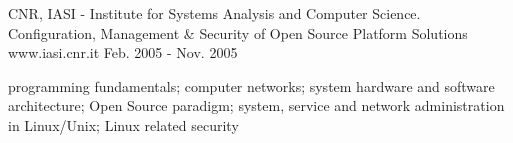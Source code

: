 \begin{cventries}
	\cventry
	{CNR, IASI - Institute for Systems Analysis and Computer Science.} %
	{Configuration, Management \& Security of Open Source Platform Solutions	} %
	{www.iasi.cnr.it} %
	{Feb. 2005 - Nov. 2005} %
	{ %
		\begin{cvitems}
			\item {programming fundamentals; computer networks; system hardware and software architecture; Open Source paradigm; system, service and network administration in Linux/Unix; Linux related security}
		\end{cvitems}
	}

\end{cventries}




